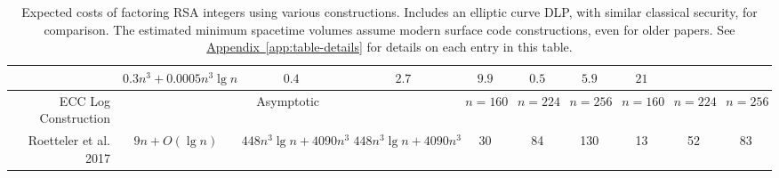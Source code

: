 \documentclass[superscriptaddress,notitlepage,longbibliography]{revtex4-1}
\theoremstyle{definition}
\theoremstyle{definition}
\DeclareRobustCommand{\app}[1]{\hyperref[app:#1]{Appendix~\ref*{app:#1}}}
\begin{document}
\begin{table}[p]
{\begin{tabular}{r||c|c|c||c|c|c||c|c|c}
    &{\boldmath $0.3 n^3 + 0.0005 n^3 \lg n$}
        &{\boldmath $0.4$}
        &{\boldmath $2.7$}
        &{\boldmath $9.9$}
            &{\boldmath $0.5$}
            &{\boldmath $5.9$}
            &{\boldmath $21$}
                \\
\hline
ECC Log Construction
    &\multicolumn{3}{|c||}{Asymptotic}
        &$n=160$ &$n=224$ &$n=256$
            &$n=160$ &$n=224$ &$n=256$
                \\
\hline
Roetteler et al. 2017 \cite{roetteler2017quantum}
    &$9n + O(\lg n)$
    &$448 n^3 \lg n + 4090 n^3$
    &$448 n^3 \lg n + 4090 n^3$
        &30
        &84
        &130
            &13
            &52
            &83
  \end{tabular}
  }
  \caption{
    Expected costs of factoring RSA integers using various constructions.
    Includes an elliptic curve DLP, with similar classical security, for comparison.
    The estimated minimum spacetime volumes assume modern surface code constructions, even for older papers.
    See \app{table-details} for details on each entry in this table.
  }
\end{table}
\end{document}
